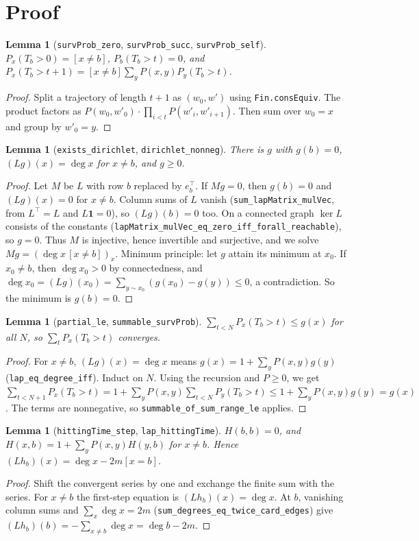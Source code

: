 \documentclass[11pt]{article}
\newtheorem{lemma}[theorem]{Lemma}
\theoremstyle{definition}
\begin{document}
\section{Proof}

\begin{lemma}[\texttt{survProb\_zero}, \texttt{survProb\_succ}, \texttt{survProb\_self}]
$P_x(T_b>0)=[x\ne b]$, $P_b(T_b>t)=0$, and
$P_x(T_b>t+1)=[x\ne b]\sum_y P(x,y)P_y(T_b>t)$.
\end{lemma}
\begin{proof}
Split a trajectory of length $t+1$ as $(w_0,w')$ using \texttt{Fin.consEquiv}. The product
factors as $P(w_0,w'_0)\cdot\prod_{i<t} P(w'_i,w'_{i+1})$. Then sum over $w_0=x$ and group by $w'_0=y$.
\end{proof}

\begin{lemma}[\texttt{exists\_dirichlet}, \texttt{dirichlet\_nonneg}]
There is $g$ with $g(b)=0$, $(Lg)(x)=\deg x$ for $x\neq b$, and $g\ge 0$.
\end{lemma}
\begin{proof}
Let $M$ be $L$ with row $b$ replaced by $e_b^{\top}$. If $Mg=0$, then $g(b)=0$ and $(Lg)(x)=0$ for
$x\ne b$. Column sums of $L$ vanish (\texttt{sum\_lapMatrix\_mulVec}, from $L^{\top}=L$ and $L\mathbf
1=0$), so $(Lg)(b)=0$ too. On a connected graph $\ker L$ consists of the constants
(\texttt{lapMatrix\_mulVec\_eq\_zero\_iff\_forall\_reachable}), so $g=0$. Thus $M$ is injective,
hence invertible and surjective, and we solve $Mg=(\deg x\,[x\ne b])_x$. Minimum principle: let
$g$ attain its minimum at $x_0$. If $x_0\ne b$, then $\deg x_0>0$ by connectedness, and
$\deg x_0=(Lg)(x_0)=\sum_{y\sim x_0}(g(x_0)-g(y))\le 0$, a contradiction. So the minimum is
$g(b)=0$.
\end{proof}

\begin{lemma}[\texttt{partial\_le}, \texttt{summable\_survProb}]
$\sum_{t<N}P_x(T_b>t)\le g(x)$ for all $N$, so $\sum_t P_x(T_b>t)$ converges.
\end{lemma}
\begin{proof}
For $x\ne b$, $(Lg)(x)=\deg x$ means $g(x)=1+\sum_yP(x,y)g(y)$ (\texttt{lap\_eq\_degree\_iff}).
Induct on $N$. Using the recursion and $P\ge0$, we get
$\sum_{t<N+1}P_x(T_b>t)=1+\sum_yP(x,y)\sum_{t<N}P_y(T_b>t)\le 1+\sum_yP(x,y)g(y)=g(x)$. The
terms are nonnegative, so \texttt{summable\_of\_sum\_range\_le} applies.
\end{proof}

\begin{lemma}[\texttt{hittingTime\_step}, \texttt{lap\_hittingTime}]
$H(b,b)=0$, and $H(x,b)=1+\sum_yP(x,y)H(y,b)$ for $x\ne b$. Hence
$(Lh_b)(x)=\deg x-2m[x=b]$.
\end{lemma}
\begin{proof}
Shift the convergent series by one and exchange the finite sum with the series. For $x\neq b$ the
first-step equation is $(Lh_b)(x)=\deg x$. At $b$, vanishing column sums and
$\sum_x\deg x=2m$ (\texttt{sum\_degrees\_eq\_twice\_card\_edges}) give
$(Lh_b)(b)=-\sum_{x\ne b}\deg x=\deg b-2m$.
\end{proof}
\end{document}
